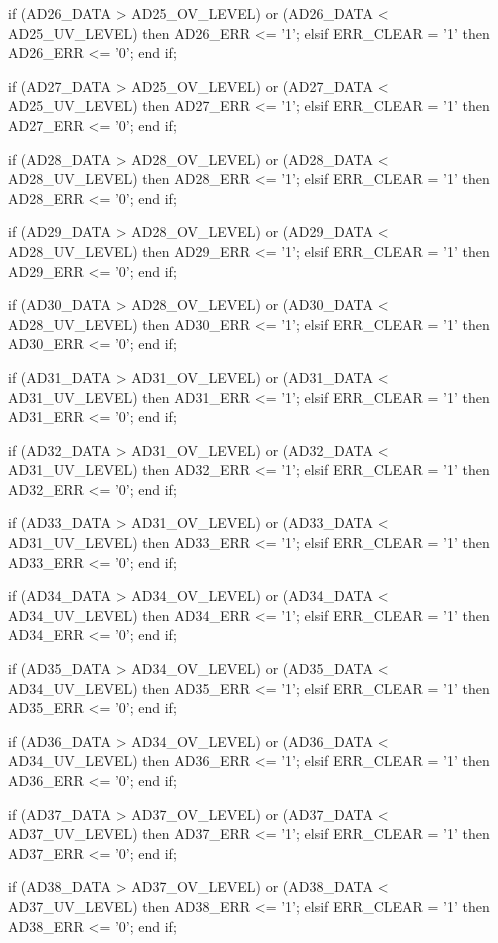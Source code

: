 \begin{mylisting}[language=VHDL,caption=AD変換モジュール,label=appF_ADC_module_VHDL]
				if (AD26_DATA > AD25_OV_LEVEL) or (AD26_DATA < AD25_UV_LEVEL) then
					AD26_ERR	<= '1';
				elsif ERR_CLEAR = '1' then
					AD26_ERR	<= '0';
				end if;
				
				if (AD27_DATA > AD25_OV_LEVEL) or (AD27_DATA < AD25_UV_LEVEL) then
					AD27_ERR	<= '1';
				elsif ERR_CLEAR = '1' then
					AD27_ERR	<= '0';
				end if;
				
				if (AD28_DATA > AD28_OV_LEVEL) or (AD28_DATA < AD28_UV_LEVEL) then
					AD28_ERR	<= '1';
				elsif ERR_CLEAR = '1' then
					AD28_ERR	<= '0';
				end if;
				
				if (AD29_DATA > AD28_OV_LEVEL) or (AD29_DATA < AD28_UV_LEVEL) then
					AD29_ERR	<= '1';
				elsif ERR_CLEAR = '1' then
					AD29_ERR	<= '0';
				end if;
				
				
				
				if (AD30_DATA > AD28_OV_LEVEL) or (AD30_DATA < AD28_UV_LEVEL) then
					AD30_ERR	<= '1';
				elsif ERR_CLEAR = '1' then
					AD30_ERR	<= '0';
				end if;
				
				if (AD31_DATA > AD31_OV_LEVEL) or (AD31_DATA < AD31_UV_LEVEL) then
					AD31_ERR	<= '1';
				elsif ERR_CLEAR = '1' then
					AD31_ERR	<= '0';
				end if;
				
				if (AD32_DATA > AD31_OV_LEVEL) or (AD32_DATA < AD31_UV_LEVEL) then
					AD32_ERR	<= '1';
				elsif ERR_CLEAR = '1' then
					AD32_ERR	<= '0';
				end if;
				
				if (AD33_DATA > AD31_OV_LEVEL) or (AD33_DATA < AD31_UV_LEVEL) then
					AD33_ERR	<= '1';
				elsif ERR_CLEAR = '1' then
					AD33_ERR	<= '0';
				end if;
				
				if (AD34_DATA > AD34_OV_LEVEL) or (AD34_DATA < AD34_UV_LEVEL) then
					AD34_ERR	<= '1';
				elsif ERR_CLEAR = '1' then
					AD34_ERR	<= '0';
				end if;
				
				if (AD35_DATA > AD34_OV_LEVEL) or (AD35_DATA < AD34_UV_LEVEL) then
					AD35_ERR	<= '1';
				elsif ERR_CLEAR = '1' then
					AD35_ERR	<= '0';
				end if;
				
				if (AD36_DATA > AD34_OV_LEVEL) or (AD36_DATA < AD34_UV_LEVEL) then
					AD36_ERR	<= '1';
				elsif ERR_CLEAR = '1' then
					AD36_ERR	<= '0';
				end if;
				
				if (AD37_DATA > AD37_OV_LEVEL) or (AD37_DATA < AD37_UV_LEVEL) then
					AD37_ERR	<= '1';
				elsif ERR_CLEAR = '1' then
					AD37_ERR	<= '0';
				end if;
				
				if (AD38_DATA > AD37_OV_LEVEL) or (AD38_DATA < AD37_UV_LEVEL) then
					AD38_ERR	<= '1';
				elsif ERR_CLEAR = '1' then
					AD38_ERR	<= '0';
				end if;
				

\end{mylisting}
